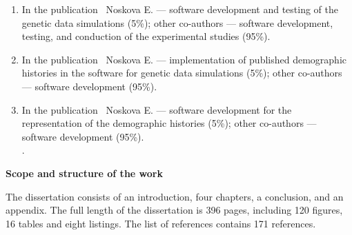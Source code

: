 \begin{enumerate}[label=\arabic*.]
    \item %
    In the publication~\cite{adrion2020community} Noskova E. --- software development and testing of the genetic data simulations (5\%); other co-authors --- software development, testing, and conduction of the experimental studies (95\%).

    \item %
    In the publication~\cite{lauterbur2023expanding} Noskova E. --- implementation of published demographic histories in the software for genetic data simulations (5\%); other co-authors --- software development (95\%).
    
    \item %
    In the publication~\cite{gower2022demes} Noskova E. --- software development for the representation of the demographic histories (5\%); other co-authors --- software development (95\%).\\.
\end{enumerate}


\textbf{Scope and structure of the work}

The dissertation consists of an introduction, four chapters, a conclusion, and an appendix.
The full length of the dissertation is 396 pages, including
120 figures, 16 tables and eight listings.
The list of references contains 171 references.